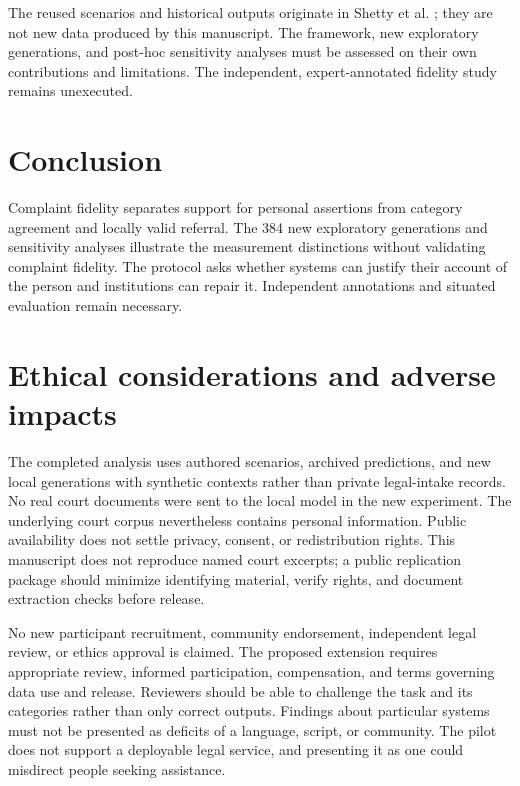 \documentclass[manuscript,screen,review,anonymous]{acmart}
\begin{document}
The reused scenarios and historical outputs originate in Shetty et al. \cite{prior}; they are not new data produced by this manuscript. The framework, new exploratory generations, and post-hoc sensitivity analyses must be assessed on their own contributions and limitations. The independent, expert-annotated fidelity study remains unexecuted.

\section{Conclusion}

Complaint fidelity separates support for personal assertions from category agreement and locally valid referral. The 384 new exploratory generations and sensitivity analyses illustrate the measurement distinctions without validating complaint fidelity. The protocol asks whether systems can justify their account of the person and institutions can repair it. Independent annotations and situated evaluation remain necessary.

\clearpage

\section*{Ethical considerations and adverse impacts}

The completed analysis uses authored scenarios, archived predictions, and new local generations with synthetic contexts rather than private legal-intake records. No real court documents were sent to the local model in the new experiment. The underlying court corpus nevertheless contains personal information. Public availability does not settle privacy, consent, or redistribution rights. This manuscript does not reproduce named court excerpts; a public replication package should minimize identifying material, verify rights, and document extraction checks before release.

No new participant recruitment, community endorsement, independent legal review, or ethics approval is claimed. The proposed extension requires appropriate review, informed participation, compensation, and terms governing data use and release. Reviewers should be able to challenge the task and its categories rather than only correct outputs. Findings about particular systems must not be presented as deficits of a language, script, or community. The pilot does not support a deployable legal service, and presenting it as one could misdirect people seeking assistance.
\end{document}
